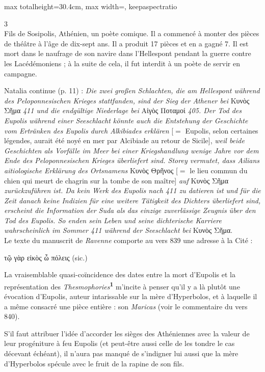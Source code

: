 \documentclass[11pt,twoside]{book}
\newcommand{\italique}[1]{\textit{#1}}
\newcommand{\citComm}[1]{\begin{quoting}[vskip=0.4pt,leftmargin=0.7em,rightmargin=0.2em]#1\end{quoting}}
\newcommand{\allemand}[1]{\textit{#1}}
\newcommand{\marqueur}[1]{\textsuperscript{\color{rubricRed}\textbf{#1}}}
\begin{document}
\begin{adjustbox}{max totalheight=30.4cm, max width=\textwidth, keepaspectratio}
\begin{minipage}{\textwidth}
{\begin{multicols}{3}
{\\
Fils de Sosipolis, Athénien, un poète comique. Il a commencé à monter des pièces de théâtre à l'âge de dix-sept ans. Il a produit 17 pièces et en a gagné 7. Il est mort dans le naufrage de son navire dans l'Hellespont pendant la guerre contre les Lacédémoniens ; à la suite de cela, il fut interdit à un poète de servir en campagne. 
}
\par\vspace{1.5pt}
\noindent Natalia continue (p. 11) : \allemand{Die zwei großen Schlachten, die am Hellespont während des Peloponnesischen Krieges stattfanden, sind der Sieg der Athener bei} Κυνὸς Σῆμα \allemand{411 und die endgültige Niederlage bei }Αἰγὸς Ποταμοί \allemand{405. Der Tod des Eupolis während einer Seeschlacht könnte auch die Entstehung der Geschichte vom Ertränken des Eupolis durch Alkibiades erklären} [$=$ Eupolis, selon certaines légendes, aurait été noyé en mer par Alcibiade au retour de Sicile], \allemand{weil beide Geschichten als Vorfälle im Meer bei einer Kriegshandlung wenige Jahre vor dem Ende des Peloponnesischen Krieges überliefert sind. Storey vermutet, dass Ailians aitiologische Erklärung des Ortsnamens} Κυνὸς Θρῆνος [$=$ le lieu commun du chien qui meurt de chagrin sur la tombe de son maître] \allemand{auf }Κυνὸς Σῆμα \allemand{zurückzuführen ist. Da kein Werk des Eupolis nach 411 zu datieren ist und für die Zeit danach keine Indizien für eine weitere Tätigkeit des Dichters überliefert sind, erscheint die Information der Suda als das einzige zuverlässige Zeugnis über den Tod des Eupolis. So enden sein Leben und seine dichterische Karriere wahrscheinlich im Sommer 411 während der Seeschlacht bei} Κυνὸς Σῆμα.\\ Le texte du manuscrit de \italique{Ravenne} comporte au vers 839 une adresse à la Cité :
\citComm{τῷ γὰρ εἰκὸς ὦ πόλεις (sic.)}
\par\vspace{1.5pt}
\noindent La vraisemblable quasi-coïncidence des dates entre la mort d'Eupolis et la représentation des \italique{Thesmophories}\marqueur{1} m'incite à penser qu'il y a là plutôt une évocation d'Eupolis, auteur intarissable sur la mère d'Hyperbolos, et à laquelle il a même consacré une pièce entière : son \italique{Maricas} (voir le commentaire du vers 840).
\par\vspace{1.5pt}
\noindent S'il faut attribuer l'idée d'accorder les sièges des Athéniennes avec la valeur de leur progéniture à feu Eupolis (et peut-être aussi celle de les tondre le cas décevant échéant), il n'aura pas manqué de s'indigner lui aussi que la mère d'Hyperbolos spécule avec le fruit de la rapine de son fils.

\end{multicols}}
\end{minipage}
\end{adjustbox}
\end{document}
